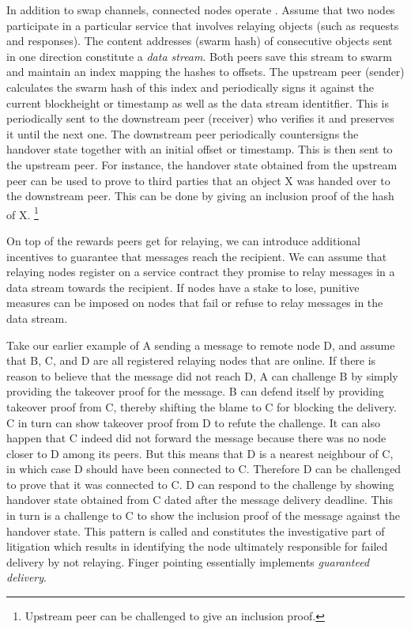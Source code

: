 In addition to swap channels, connected nodes operate . Assume that two nodes participate in a particular service that involves relaying objects (such as requests and responses). The content addresses (swarm hash) of consecutive objects sent in one direction constitute a \emph{data stream}. Both peers save this stream to swarm and maintain an index mapping the hashes to offsets. The upstream peer (sender) calculates the swarm hash of this index and periodically signs it against the current blockheight or timestamp as well as the data stream identitfier. This  is periodically sent to the downstream peer (receiver)
who verifies it and preserves it until the next one. The downstream peer periodically countersigns the handover state together with an initial offset or timestamp. This  is then sent to the upstream peer. For instance, the handover state obtained from the upstream peer can be used to prove to third parties that an object X was handed over to the downstream peer. This can be done by giving an inclusion proof of the hash of X.%
%
\footnote{Upstream peer can be challenged to give an inclusion proof.}

On top of the rewards peers get for relaying, we can introduce additional incentives to guarantee that messages reach the recipient. We can assume that relaying nodes register on a service contract they promise to relay messages in a data stream towards the recipient. If nodes have a stake to lose, punitive measures can be imposed on nodes that fail or refuse to relay messages in the data stream.

Take our earlier example of A sending a message to remote node D, and assume that B, C, and D are all registered relaying nodes that are online. If there is reason to believe that the message did not reach D, A can challenge B by simply providing the takeover proof for the message. B can defend itself by providing takeover proof from C, thereby shifting the blame to C for blocking the delivery. C in turn can show takeover proof from D to refute the challenge. It can also happen that C indeed did not forward the message because there was no node closer to D among its peers. But this means that D is a nearest neighbour of C, in which case D should have been connected to C.
Therefore D can be challenged to prove that it was connected to C. D can respond to the challenge
by showing handover state obtained from C dated after the message delivery deadline. This in turn is
a challenge to C to show the inclusion proof of the message against the handover state.
This pattern is called  and constitutes the investigative part
of litigation which results in identifying the node
ultimately responsible for failed delivery by not relaying.
Finger pointing essentially implements \emph{guaranteed delivery}.

